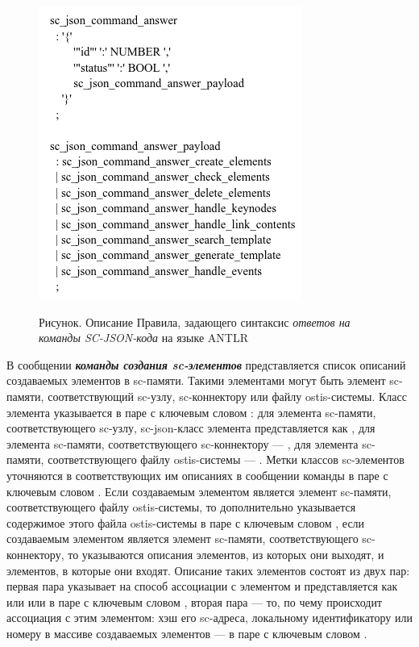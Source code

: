 \begin{figure}[H]
  \center
	\caption{Рисунок. Описание Правила, задающего синтаксис \textit{ответов на команды SC-JSON-кода} на языке ANTLR}
  \includegraphics[scale=0.5]{author/part6/figures/command_answer.png}
  \label{fig:command_answer}
\end{figure}

В сообщении \textbf{\textit{команды создания sc-элементов}} представляется список описаний создаваемых элементов в sc-памяти. Такими элементами могут быть элемент sc-памяти, соответствующий sc-узлу, sc-коннектору или файлу ostis-системы. Класс элемента указывается в паре с ключевым словом : для элемента sc-памяти, соответствующего sc-узлу, sc-json-класс элемента представляется как , для элемента sc-памяти, соответствующего sc-коннектору --- , для элемента sc-памяти, соответствующего файлу ostis-системы --- . Метки классов sc-элементов уточняются в соответствующих им описаниях в сообщении команды в паре с ключевым словом . Если создаваемым элементом является элемент sc-памяти, соответствующего файлу ostis-системы, то дополнительно указывается содержимое этого файла ostis-системы в паре с ключевым словом , если создаваемым элементом является элемент sc-памяти, соответствующего sc-коннектору, то указываются описания элементов, из которых они выходят, и элементов, в которые они входят. Описание таких элементов состоят из двух пар: первая пара указывает на способ ассоциации с элементом и представляется как  или  или  в паре с ключевым словом , вторая пара --- то, по чему происходит ассоциация с этим элементом: хэш его sc-адреса, локальному идентификатору или номеру в массиве создаваемых элементов --- в паре с ключевым словом  .

